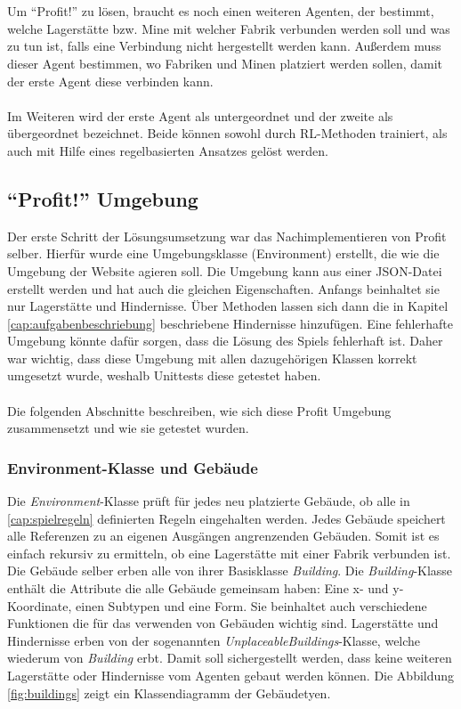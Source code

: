 \\\\
Um “Profit!” zu lösen, braucht es noch einen weiteren Agenten, der bestimmt, welche Lagerstätte bzw. Mine mit welcher Fabrik verbunden werden soll und was zu tun ist, falls eine Verbindung nicht hergestellt werden kann. Außerdem muss dieser Agent bestimmen, wo Fabriken und Minen platziert werden sollen, damit der erste Agent diese verbinden kann.
\\\\
Im Weiteren wird der erste Agent als untergeordnet und der zweite als übergeordnet bezeichnet. Beide können sowohl durch RL-Methoden trainiert, als auch mit Hilfe eines regelbasierten Ansatzes gelöst werden. 

\subsection{“Profit!” Umgebung}
Der erste Schritt der Lösungsumsetzung war das Nachimplementieren von Profit selber.  Hierfür wurde eine Umgebungsklasse (Environment) erstellt, die wie die Umgebung der Website agieren soll. Die Umgebung kann aus einer JSON-Datei erstellt werden und hat auch die gleichen Eigenschaften. Anfangs beinhaltet sie nur Lagerstätte und Hindernisse. Über Methoden lassen sich dann die in Kapitel \ref{cap:aufgabenbeschriebung} beschriebene Hindernisse hinzufügen.
Eine fehlerhafte Umgebung könnte dafür sorgen, dass die Lösung des Spiels fehlerhaft ist.
Daher war wichtig, dass diese Umgebung mit allen dazugehörigen Klassen korrekt umgesetzt wurde, weshalb Unittests diese getestet haben. 
\\\\
Die folgenden Abschnitte beschreiben, wie sich diese Profit Umgebung zusammensetzt und wie sie getestet wurden.

\subsubsection{Environment-Klasse und Gebäude}
Die \textit{Environment}-Klasse prüft für jedes neu platzierte Gebäude, ob alle in \ref{cap:spielregeln} definierten Regeln eingehalten werden. Jedes Gebäude speichert alle Referenzen zu an eigenen Ausgängen angrenzenden Gebäuden. Somit ist es einfach rekursiv zu ermitteln, ob eine Lagerstätte mit einer Fabrik verbunden ist.
Die Gebäude selber erben alle von ihrer Basisklasse \textit{Building}. Die \textit{Building}-Klasse enthält die Attribute die alle Gebäude gemeinsam haben: Eine x- und y-Koordinate, einen Subtypen und eine Form. Sie beinhaltet auch verschiedene Funktionen die für das verwenden von Gebäuden wichtig sind. Lagerstätte und Hindernisse erben von der sogenannten \textit{UnplaceableBuildings}-Klasse, welche wiederum von \textit{Building} erbt. Damit soll sichergestellt werden, dass keine weiteren Lagerstätte oder Hindernisse vom Agenten gebaut werden können. Die Abbildung \ref{fig:buildings} zeigt ein Klassendiagramm der Gebäudetyen.

